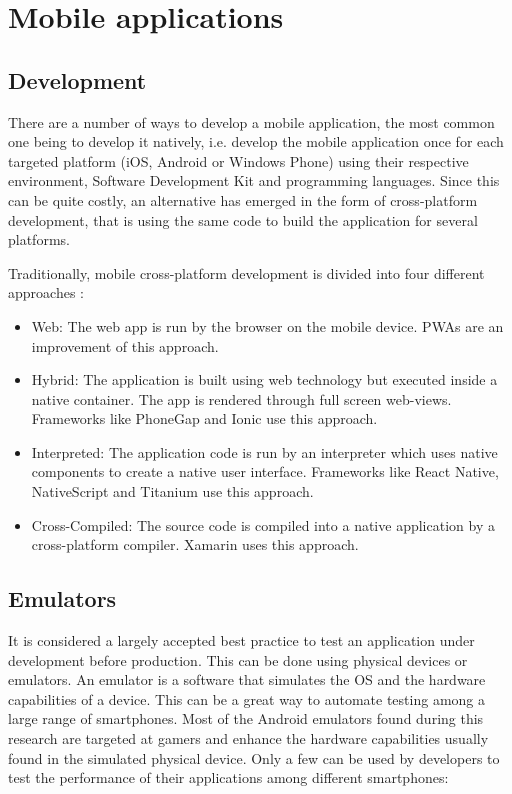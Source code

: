 \documentclass{kththesis}
\begin{document}
\section{Mobile applications}
\subsection{Development}
There are a number of ways to develop a mobile application, the most common one being to develop it natively, i.e. develop the mobile application once for each targeted platform (iOS, Android or Windows Phone) using their respective environment, Software Development Kit and programming languages. Since this can be quite costly, an alternative has emerged in the form of cross-platform development, that is using the same code to build the application for several platforms.

Traditionally, mobile cross-platform development is divided into four different approaches \cite{CrossPlatform_dev}:
\begin{itemize}
    \item Web: The web app is run by the browser on the mobile device. PWAs are an improvement of this approach.
    \item Hybrid: The application is built using web technology but executed inside a native container. The app is rendered through full screen web-views. Frameworks like PhoneGap and Ionic \cite{crossplatform_approaches} use this approach.
    \item Interpreted: The application code is run by an interpreter which uses native components to create a native user interface. Frameworks like React Native, NativeScript and Titanium \cite{emulating_native_w_crossplatform} use this approach.
    \item Cross-Compiled: The source code is compiled into a native application by a cross-platform compiler. Xamarin \cite{crossplatform_approaches} uses this approach. 
\end{itemize}


\subsection{Emulators}
    It is considered a largely accepted best practice to test an application under development before production. This can be done using physical devices or emulators. An emulator is a software that simulates the OS and the hardware capabilities of a device\cite{emulator_def}. This can be a great way to automate testing among a large range of smartphones. Most of the Android emulators found during this research are targeted at gamers and enhance the hardware capabilities usually found in the simulated physical device. Only a few can be used by developers to test the performance of their applications among different smartphones:
    
\end{document}
